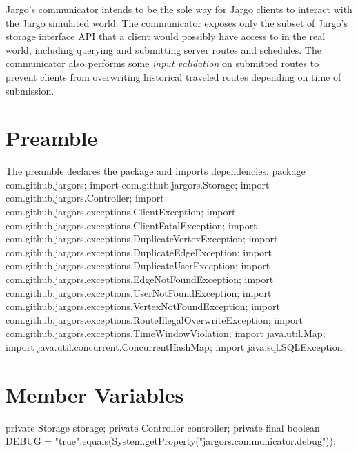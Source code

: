 Jargo's communicator intends to be the sole way for Jargo clients to interact
with the Jargo simulated world. The communicator exposes only the subset of
Jargo's storage interface API that a client would possibly have access to in
the real world, including querying and submitting server routes and schedules.
The communicator also performs some \emph{input validation} on submitted routes
to prevent clients from overwriting historical traveled routes depending on
time of submission.

\section{Preamble}
The preamble declares the package and imports dependencies.
\nwenddocs{}\endmoddef{}
package com.github.jargors;
\nwendcode{}\nwdocspar
\nwenddocs{}\plusendmoddef
import com.github.jargors.Storage;
import com.github.jargors.Controller;
import com.github.jargors.exceptions.ClientException;
import com.github.jargors.exceptions.ClientFatalException;
import com.github.jargors.exceptions.DuplicateVertexException;
import com.github.jargors.exceptions.DuplicateEdgeException;
import com.github.jargors.exceptions.DuplicateUserException;
import com.github.jargors.exceptions.EdgeNotFoundException;
import com.github.jargors.exceptions.UserNotFoundException;
import com.github.jargors.exceptions.VertexNotFoundException;
import com.github.jargors.exceptions.RouteIllegalOverwriteException;
import com.github.jargors.exceptions.TimeWindowViolation;
import java.util.Map;
import java.util.concurrent.ConcurrentHashMap;
import java.sql.SQLException;
\nwendcode{}\nwdocspar

\section{Member Variables}
\nwenddocs{}\endmoddef{}
private Storage storage;
private Controller controller;
private final boolean DEBUG = "true".equals(System.getProperty("jargors.communicator.debug"));
\nwendcode{}\nwdocspar

